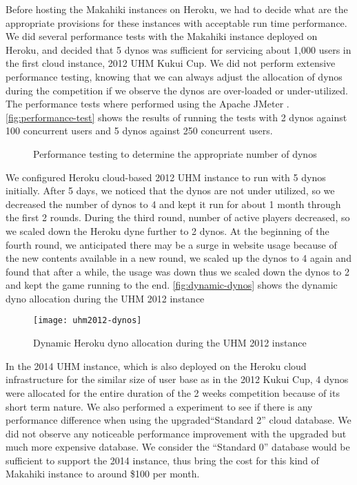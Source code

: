 Before hosting the Makahiki instances on Heroku, we had to decide what are the appropriate provisions for these instances with acceptable run time performance. 
We did several performance tests with the Makahiki instance deployed on Heroku, and decided that 5 dynos was sufficient for servicing about 1,000 users in the first cloud instance, 2012 UHM Kukui Cup. We did not perform extensive performance testing, knowing that we can always adjust the allocation of dynos during the competition if we observe the dynos are over-loaded or under-utilized. The performance tests where performed using the Apache JMeter \cite{jmeter}. \autoref{fig:performance-test} shows the results of running the tests with 2 dynos against 100 concurrent users and 5 dynos against 250 concurrent users.

\begin{figure}[ht!]
	\centering
		\caption{Performance testing to determine the appropriate number of dynos}
		\label{fig:performance-test}
\end{figure}

We configured Heroku cloud-based 2012 UHM instance to run with 5 dynos initially. After 5 days, we noticed that the dynos are not under utilized, so we decreased the number of dynos to 4 and kept it run for about 1 month through the first 2 rounds. During the third round, number of active players decreased, so we scaled down the Heroku dyne further to 2 dynos. At the beginning of the fourth round, we anticipated there may be a surge in website usage because of the new contents available in a new round, we scaled up the dynos to 4 again and found that after a while, the usage was down thus we scaled down the dynos to 2 and kept the game running to the end. \autoref{fig:dynamic-dynos} shows the dynamic dyno allocation during the UHM 2012 instance

\begin{figure}[ht!]
  \center
  \texttt{[image: uhm2012-dynos]}
  \caption{Dynamic Heroku dyno allocation during the UHM 2012 instance}
  \label{fig:dynamic-dynos}
\end{figure}

In the 2014 UHM instance, which is also deployed on the Heroku cloud infrastructure for the similar size of user base as in the 2012 Kukui Cup, 4 dynos were allocated for the entire duration of the 2 weeks competition because of its short term nature. We also performed a experiment to see if there is any performance difference when using the upgraded``Standard 2'' cloud database. We did not observe any noticeable performance improvement with the upgraded but much more expensive database. We consider the ``Standard 0'' database would be sufficient to support the 2014 instance, thus bring the cost for this kind of Makahiki instance to around \$100 per month.


